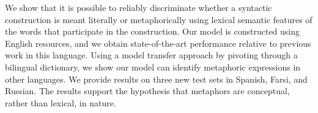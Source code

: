 We show that it is possible to reliably discriminate whether a syntactic construction is meant literally or metaphorically using lexical semantic features of the words that participate in the construction. Our model is constructed using English resources, and we obtain state-of-the-art performance relative to previous work in this language. Using a model transfer approach by pivoting through a bilingual dictionary, we show our model can identify metaphoric expressions in other languages. We provide results on three new test sets in Spanish, Farsi, and Russian. The results support the hypothesis that metaphors are conceptual, rather than lexical, in nature.
